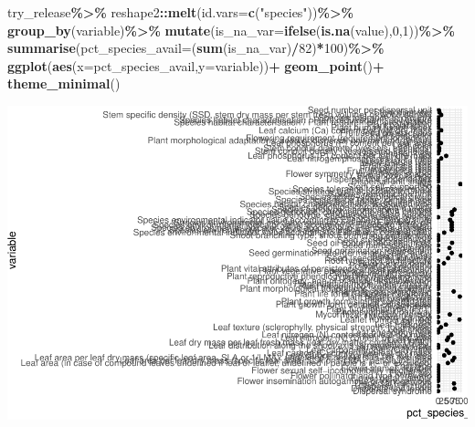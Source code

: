 \documentclass[
  12pt,
  american,
  a4paper,
  extrafontsizes,onecolumn,openright
  ]{memoir}
\newenvironment{Shaded}{\begin{snugshade}}{\end{snugshade}}
\newcommand{\AttributeTok}[1]{\textcolor[rgb]{0.13,0.29,0.53}{#1}}
\newcommand{\DecValTok}[1]{\textcolor[rgb]{0.00,0.00,0.81}{#1}}
\newcommand{\FunctionTok}[1]{\textcolor[rgb]{0.13,0.29,0.53}{\textbf{#1}}}
\newcommand{\NormalTok}[1]{#1}
\newcommand{\SpecialCharTok}[1]{\textcolor[rgb]{0.81,0.36,0.00}{\textbf{#1}}}
\newcommand{\StringTok}[1]{\textcolor[rgb]{0.31,0.60,0.02}{#1}}
\begin{document}
\begin{Shaded}
\begin{Highlighting}[]
\NormalTok{try\_release}\SpecialCharTok{\%\textgreater{}\%}
\NormalTok{  reshape2}\SpecialCharTok{::}\FunctionTok{melt}\NormalTok{(}\AttributeTok{id.vars=}\FunctionTok{c}\NormalTok{(}\StringTok{"species"}\NormalTok{))}\SpecialCharTok{\%\textgreater{}\%}
  \FunctionTok{group\_by}\NormalTok{(variable)}\SpecialCharTok{\%\textgreater{}\%}
  \FunctionTok{mutate}\NormalTok{(}\AttributeTok{is\_na\_var=}\FunctionTok{ifelse}\NormalTok{(}\FunctionTok{is.na}\NormalTok{(value),}\DecValTok{0}\NormalTok{,}\DecValTok{1}\NormalTok{))}\SpecialCharTok{\%\textgreater{}\%}
  \FunctionTok{summarise}\NormalTok{(}\AttributeTok{pct\_species\_avail=}\NormalTok{(}\FunctionTok{sum}\NormalTok{(is\_na\_var)}\SpecialCharTok{/}\DecValTok{82}\NormalTok{)}\SpecialCharTok{*}\DecValTok{100}\NormalTok{)}\SpecialCharTok{\%\textgreater{}\%}
  \FunctionTok{ggplot}\NormalTok{(}\FunctionTok{aes}\NormalTok{(}\AttributeTok{x=}\NormalTok{pct\_species\_avail,}\AttributeTok{y=}\NormalTok{variable))}\SpecialCharTok{+}
  \FunctionTok{geom\_point}\NormalTok{()}\SpecialCharTok{+}
  \FunctionTok{theme\_minimal}\NormalTok{()}
\end{Highlighting}
\end{Shaded}

\includegraphics{Wiki_INHERSEED_files/figure-latex/unnamed-chunk-3-1.pdf}
\end{document}
